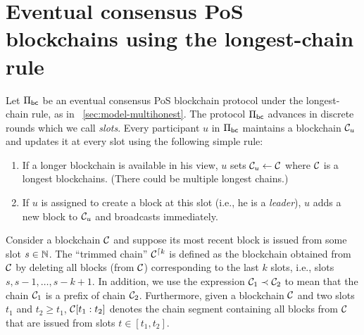 


\section{Eventual consensus PoS blockchains using the longest-chain rule}
    Let $\Pi_\mathsf{bc}$ be an eventual consensus PoS blockchain protocol 
    under the longest-chain rule, 
    as in \Section~\ref{sec:model-multihonest}. 
    The protocol $\Pi_\mathsf{bc}$ advances in discrete rounds 
    which we call \emph{slots}.
    Every participant $u$ in $\Pi_\mathsf{bc}$ 
    maintains a blockchain $\mathcal{C}_u$ 
    and updates it at every slot using the following simple rule: 
    \begin{enumerate}
      \item If a longer blockchain is available in his view, 
      $u$ sets $\mathcal{C}_u \leftarrow \mathcal{C}$ where 
      $\mathcal{C}$ is a longest blockchains. 
      (There could be multiple longest chains.)

      \item If $u$ is assigned to create a block at this slot 
      (i.e., he is a \emph{leader}),
      $u$ adds a new block to $\mathcal{C}_u$ and broadcasts immediately.
    \end{enumerate}

    Consider a blockchain $\mathcal{C}$ and suppose its most recent block is issued from some slot $s \in \mathbb{N}$. 
    The ``trimmed chain'' $\mathcal{C}^{\lceil {k}}$ is defined as 
    the blockchain obtained from $\mathcal{C}$ by deleting all blocks (from $\mathcal{C}$) 
    corresponding to the last $k$ slots, i.e., slots $s, s - 1, \ldots, s - k + 1$. 
    In addition, we use the expression $\mathcal{C}_1 \prec \mathcal{C}_2$ to mean that 
    the chain $\mathcal{C}_1$ is a prefix of chain $\mathcal{C}_2$. 
    Furthermore, given a blockchain $\mathcal{C}$ and two slots $t_1$ and $t_2 \geq t_1$, 
    $\mathcal{C}[t_1 : t_2]$ denotes the chain segment containing all blocks from $\mathcal{C}$ 
    that are issued from slots $t \in [t_1, t_2]$.

